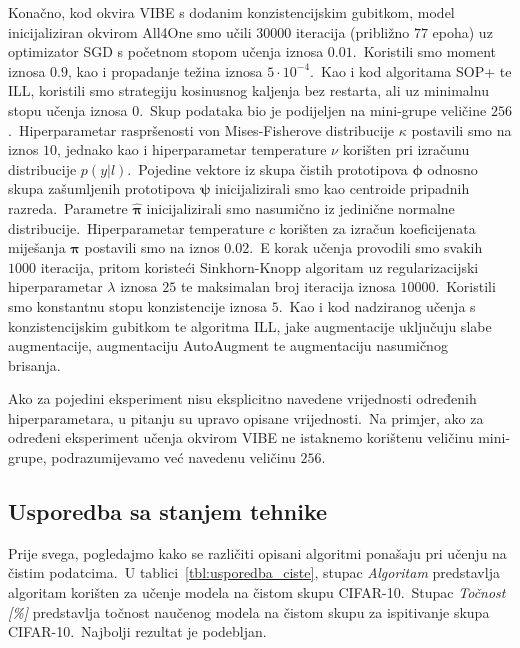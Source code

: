 \documentclass[diplomskirad]{fer}
\begin{document}
Konačno, kod okvira VIBE s dodanim konzistencijskim gubitkom, model inicijaliziran okvirom All4One smo učili $30 000$ iteracija (približno $77$ epoha) uz optimizator SGD s početnom stopom učenja iznosa $0.01$.\ 
Koristili smo moment iznosa $0.9$, kao i propadanje težina iznosa $5 \cdot 10^{-4}$.\ Kao i kod algoritama SOP+ te ILL, koristili smo strategiju kosinusnog kaljenja bez restarta, ali uz minimalnu stopu učenja iznosa $0$.\ 
Skup podataka bio je podijeljen na mini-grupe veličine $256$.\ Hiperparametar raspršenosti von Mises-Fisherove distribucije $\kappa$ postavili smo na iznos $10$, jednako kao i hiperparametar temperature $\nu$ korišten pri izračunu distribucije $p(y | l)$.\ 
Pojedine vektore iz skupa čistih prototipova $\bm{\phi}$ odnosno skupa zašumljenih prototipova $\bm{\psi}$ inicijalizirali smo kao centroide pripadnih razreda.\ Parametre $\bm{\hat{\pi}}$ inicijalizirali smo nasumično iz jedinične normalne distribucije.\ 
Hiperparametar temperature $c$ korišten za izračun koeficijenata miješanja $\bm{\pi}$ postavili smo na iznos $0.02$.\ E korak učenja provodili smo svakih $1000$ iteracija, pritom koristeći Sinkhorn-Knopp algoritam uz regularizacijski hiperparametar $\lambda$ iznosa $25$ te maksimalan broj iteracija iznosa $10 000$.\ 
Koristili smo konstantnu stopu konzistencije iznosa $5$.\ Kao i kod nadziranog učenja s konzistencijskim gubitkom te algoritma ILL, jake augmentacije uključuju slabe augmentacije, augmentaciju AutoAugment te augmentaciju nasumičnog brisanja.\ 

Ako za pojedini eksperiment nisu eksplicitno navedene vrijednosti određenih hiperparametara, u pitanju su upravo opisane vrijednosti.\ 
Na primjer, ako za određeni eksperiment učenja okvirom VIBE ne istaknemo korištenu veličinu mini-grupe, podrazumijevamo već navedenu veličinu $256$.\

\subsection{Usporedba sa stanjem tehnike}
\label{sub:usporedba_zasumljene}

Prije svega, pogledajmo kako se različiti opisani algoritmi ponašaju pri učenju na čistim podatcima.\ 
U tablici~\ref{tbl:usporedba_ciste}, stupac \textit{Algoritam} predstavlja algoritam korišten za učenje modela na čistom skupu CIFAR-10.\ 
Stupac \textit{Točnost [\%]} predstavlja točnost naučenog modela na čistom skupu za ispitivanje skupa CIFAR-10.\ Najbolji rezultat je podebljan.\ 

\pagebreak
\end{document}
